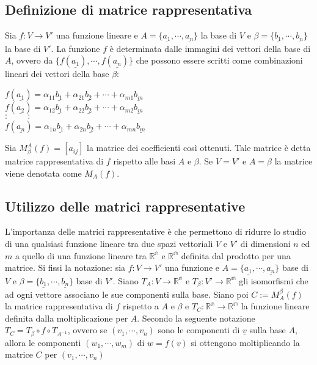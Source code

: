 \subsection{Definizione di matrice rappresentativa}
Sia $f:V\rightarrow V'$ una funzione lineare e $A=\{\underline{a_1},\cdots, \underline{a_n}\}$ la base di $V$ e $\beta=\{\underline{b_1},\cdots, \underline{b_n}\}$ la base di 
$V'$. La funzione $f$ \`e determinata dalle immagini dei vettori della base di $A$, ovvero da $\{f(\underline{a_1}),\cdots, f(\underline{a_n})\}$ che possono essere scritti 
come combinazioni lineari dei vettori della base $\beta$:
\begin{center}
$f(\underline{a_1}) =\alpha_{11}\underline{b_1} + \alpha_{21}\underline{b_2}+\cdots + \alpha_{m1}\underline{b_m}$\\
$f(\underline{a_2}) =\alpha_{12}\underline{b_1} + \alpha_{22}\underline{b_2}+\cdots + \alpha_{m2}\underline{b_m}$\\
$\cdot\;\;\;\;\;\;\;\;\cdot$\\
$\cdot\;\;\;\;\;\;\;\;\cdot$\\
$f(\underline{a_n}) =\alpha_{1n}\underline{b_1} + \alpha_{2n}\underline{b_2}+\cdots + \alpha_{mn}\underline{b_m}$\\
\end{center}
Sia $M_\beta^A(f)=[a_{ij}]$ la matrice dei coefficienti cos\`i ottenuti. Tale matrice \`e detta matrice rappresentativa di $f$ rispetto alle basi $A$ e $\beta$. Se $V=V'$ e 
$A=\beta$ la matrice viene denotata come $M_A(f)$.
\subsection{Utilizzo delle matrici rappresentative}
L'importanza delle matrici rappresentative \`e che permettono di ridurre lo studio di una qualsiasi funzione lineare tra due spazi vettoriali $V$ e $V'$ di dimensioni $n$ ed $m$ 
a quello di una funzione lineare tra $\mathbb{R^n}$ e $\mathbb{R^m}$ definita dal prodotto per una matrice. Si fissi la notazione: sia $f:V\rightarrow V'$ una funzione e $A=\{
\underline{a_1},\cdots,\underline{a_n}\}$ base di $V$ e $\beta=\{\underline{b_1},\cdots,\underline{b_n}\}$ base di $V'$. Siano $T_A:V\rightarrow\mathbb{R^n}$ e $T_\beta:V'\rightarrow\mathbb{R^m}$ gli isomorfismi che ad ogni vettore associano le sue componenti sulla base. Siano poi $C:=M_A^\beta(f)$ la matrice rappresentativa di $f$ 
rispetto a $A$ e $\beta$ e $T_C:\mathbb{R^n}\rightarrow\mathbb{R^m}$ la funzione lineare definita dalla moltiplicazione per $A$. Secondo la seguente notazione $T_C=T_\beta\circ
f\circ T_{A^{-1}}$, ovvero se $(v_1,\cdots, v_n)$ sono le componenti di $\underline{v}$ sulla base $A$, allora le componenti $(w_1,\cdots,w_m)$ di $\underline{w}=f(\underline{v})$ si ottengono moltiplicando la matrice $C$ per $(v_1,\cdots, v_n)$
